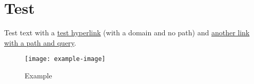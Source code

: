 \chapter{Test}

Test text with a \href{https://www.dickimaw-books.com/}{test hyperlink}
(with a domain and no path) and 
\href{https://www.dickimaw-books.com/booklist.php?book_id=14}{another
link with a path and query}.

\begin{figure}
\centering
\texttt{[image: example-image]}
\caption{Example}\label{fig:example}
\end{figure}

\newcommand{\test}{Test command}
